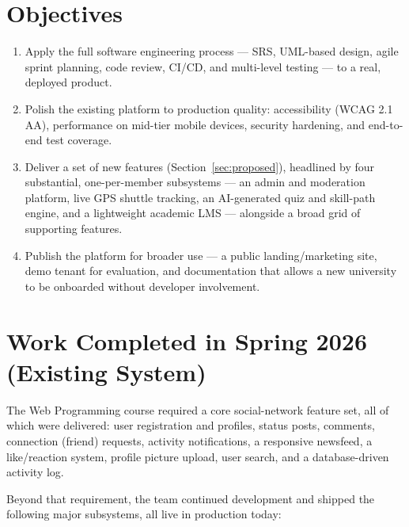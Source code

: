 \documentclass[11pt, a4paper]{article}
\begin{document}
\section{Objectives}

\begin{enumerate}[leftmargin=1.5em, itemsep=2pt]
    \item Apply the full software engineering process --- SRS, UML-based
    design, agile sprint planning, code review, CI/CD, and multi-level
    testing --- to a real, deployed product.
    \item Polish the existing platform to production quality: accessibility
    (WCAG 2.1 AA), performance on mid-tier mobile devices, security
    hardening, and end-to-end test coverage.
    \item Deliver a set of new features (Section~\ref{sec:proposed}),
    headlined by four substantial, one-per-member subsystems --- an admin
    and moderation platform, live GPS shuttle tracking, an AI-generated quiz
    and skill-path engine, and a lightweight academic LMS --- alongside a
    broad grid of supporting features.
    \item Publish the platform for broader use --- a public landing/marketing
    site, demo tenant for evaluation, and documentation that allows a new
    university to be onboarded without developer involvement.
\end{enumerate}

\section{Work Completed in Spring 2026 (Existing System)}
\label{sec:existing}

The Web Programming course required a core social-network feature set, all
of which were delivered: user registration and profiles, status posts,
comments, connection (friend) requests, activity notifications, a responsive
newsfeed, a like/reaction system, profile picture upload, user search, and a
database-driven activity log.

Beyond that requirement, the team continued development and shipped the
following major subsystems, all live in production today:
\end{document}
